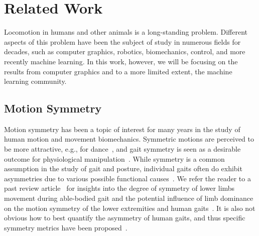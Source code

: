 \chapter{Related Work}
\label{ch:relatedwork}


Locomotion in humans and other animals is a long-standing problem. Different aspects of this problem have been the subject of study in numerous fields for decades, such as computer graphics, robotics, biomechanics, control, and more recently machine learning. In this work, however, we will be focusing on the results from computer graphics and to a more limited extent, the machine learning community.




\section{Motion Symmetry}
Motion symmetry has been a topic of interest for many years in the study of human motion and movement biomechanics. 
Symmetric motions are perceived to be more attractive, e.g., for dance~\cite{danceSymmetry},
and gait symmetry is seen as a desirable outcome for physiological manipulation~\cite{robinson1987use}.
While symmetry is a common assumption in the study of gait and posture, 
individual gaits often do exhibit asymmetries due to various possible functional causes~\cite{seelet}.
We refer the reader to a past review article~\cite{SADEGHI200034} for insights
into the degree of symmetry of lower limbs movement during able-bodied gait
and the potential influence of limb dominance on the motion symmetry of the lower extremities
and human gaits~\cite{riskowski}.
It is also not obvious how to best quantify 
the asymmetry of human gaits, and thus specific symmetry metrics have been
proposed~\cite{symmetry_measures,symmetry_phase_portrait}.



